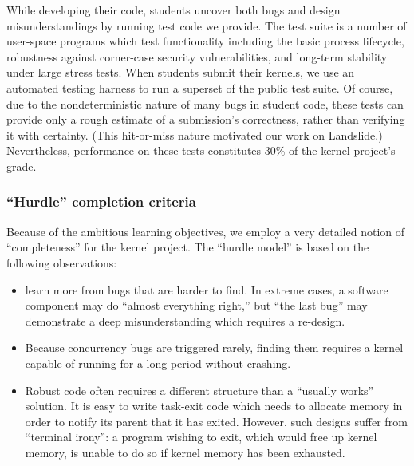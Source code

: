 While developing their code, students uncover both bugs
and design misunderstandings by running test code we
provide.
The test suite is a number of user-space programs which test
functionality
including the basic process lifecycle, robustness
against corner-case security vulnerabilities, and long-term stability
under large stress tests.
%
When students submit their kernels,
we use an automated testing harness to
run a superset of the public test suite.
%
Of course, due to the nondeterministic nature of many bugs in student code,
these tests can provide only a rough estimate of a submission's correctness,
rather than verifying it with certainty.
(This hit-or-miss nature motivated our work on Landslide.)
Nevertheless, performance on these tests constitutes 30\% of the kernel project's grade.

\subsubsection{``Hurdle'' completion criteria}

Because of the ambitious learning objectives,
we employ a very detailed notion of ``completeness''
for the kernel project.
The ``hurdle model'' is based on the following observations:

\begin{itemize}

\item {} learn more from bugs
that are harder to find.
In extreme cases, a software component may do
``almost everything right,'' but ``the last bug'' may
demonstrate a deep misunderstanding which requires a re-design.

\item Because concurrency bugs are triggered rarely,
finding them requires a kernel capable of running
for a long period without crashing.

\item Robust code often requires a different structure
than a ``usually works'' solution.
It is easy to write task-exit code which
needs to allocate memory in order to notify its
parent that it has exited.
However, such designs suffer from ``terminal irony'':
a program wishing to exit,
which would free up kernel memory,
is unable to do so if kernel memory has been exhausted.

\end{itemize}

